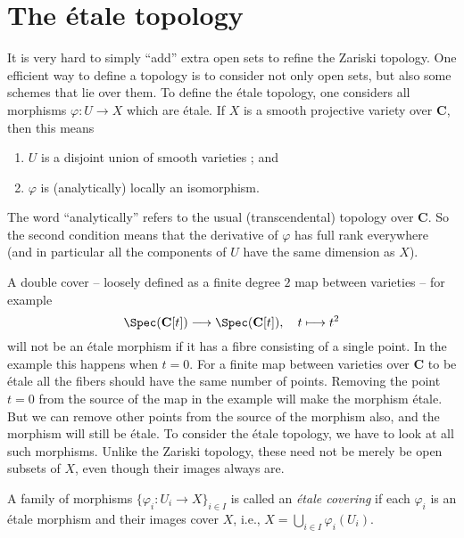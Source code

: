 \section{The \'etale topology}
\label{section-etale-topology}

\noindent
It is very hard to simply ``add'' extra open sets to refine the Zariski
topology. One efficient way to define a topology is to consider not only open
sets, but also some schemes that lie over them. To define the \'etale topology,
one considers all morphisms $\varphi: U \to X$ which are \'etale. If
$X$ is a smooth projective variety over $\mathbf{C}$, then this means
\begin{enumerate}
\item $U$ is a disjoint union of smooth varieties ; and
\item $\varphi$ is (analytically) locally an isomorphism.
\end{enumerate}
The word ``analytically'' refers to the usual (transcendental) topology over
$\mathbf{C}$. So the second condition means that the derivative of $\varphi$
has full rank everywhere (and in particular all the components of $U$
have the same dimension as $X$).

\medskip\noindent
A double cover -- loosely defined as a finite degree $2$ map between varieties
-- for example
$$
\Spec(\mathbf{C}[t])
\longrightarrow
\Spec(\mathbf{C}[t]),
\quad t \longmapsto t^2
$$
will not be an \'etale morphism if it has a fibre consisting of a single point.
In the example this happens when $t = 0$. For a finite map between varieties
over $\mathbf{C}$ to be \'etale all the fibers should have the same number of
points. Removing the point $t = 0$ from the source of the map in the example
will make the morphism \'etale. But we can remove other points from the source
of the morphism also, and the morphism will still be \'etale.  To consider the
\'etale topology, we have to look at all such morphisms. Unlike the Zariski
topology, these need not be merely be open subsets of $X$, even though their
images always are.

\begin{definition}
\label{definition-etale-covering-initial}
A family of morphisms $\{ \varphi_i : U_i \to X\}_{i \in I}$ is
called an {\it \'etale covering} if each $\varphi_i$ is an \'etale morphism
and their images cover $X$, i.e.,
$X = \bigcup_{i \in I} \varphi_i(U_i)$.
\end{definition}

